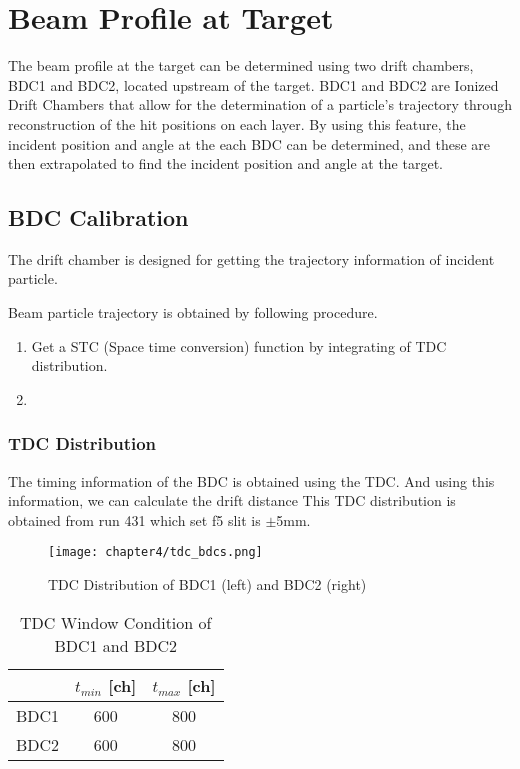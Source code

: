 \clearpage

\section{Beam Profile at Target}

The beam profile at the target can be determined using two drift chambers, BDC1 and BDC2, located upstream of the target. BDC1 and BDC2 are Ionized Drift Chambers that allow for the determination of a particle's trajectory through reconstruction of the hit positions on each layer. By using this feature, the incident position and angle at the each BDC can be determined, and these are then extrapolated to find the incident position and angle at the target.

\subsection{BDC Calibration}
The drift chamber is designed for getting the trajectory information of incident particle. 

Beam particle trajectory is obtained by following procedure.
\begin{enumerate}
    \item Get a STC (Space time conversion) function by integrating of TDC distribution.
    \item 
\end{enumerate}

\subsubsection{TDC Distribution}
The timing information of the BDC is obtained using the TDC. And using this information, we can calculate the drift distance
This TDC distribution is obtained from run 431 which set f5 slit is $\pm$5mm. 

\begin{figure}
    \centering
    \texttt{[image: chapter4/tdc\_bdcs.png]}
    \caption[TDC Distribution of BDCs]{TDC Distribution of BDC1 (left) and BDC2 (right)}
\end{figure}
\begin{table}[h]
    \centering
    \begin{tabular}{c|cc}
        \hline
        &$t_{min}$ [ch]&$t_{max}$ [ch]\\
        \hline
        BDC1&600&800\\
        BDC2&600&800\\        
        \hline
    \end{tabular}
    \caption[TDC Window Condition of BDCs]{TDC Window Condition of BDC1 and BDC2}
\end{table}

